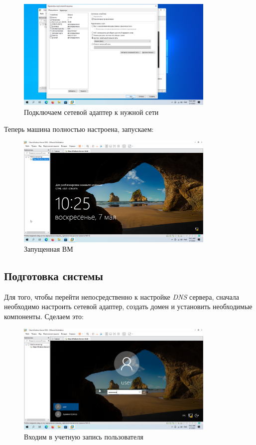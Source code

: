 \documentclass[a4paper]{article}
\begin{document}
  \begin{figure}[H]
    \centering
    \includegraphics[width=0.85\textwidth]{9_0011}
    \caption{Подключаем сетевой адаптер к нужной сети}
    \label{img:0011}
  \end{figure}

  Теперь машина полностью настроена, запускаем:

  \begin{figure}[H]
    \centering
    \includegraphics[width=0.85\textwidth]{9_0012}
    \caption{Запущенная ВМ}
    \label{img:0012}
  \end{figure}

  \subsection{Подготовка системы}

  Для того, чтобы перейти непосредственно к настройке \textit{DNS} сервера, сначала
  необходимо настроить сетевой адаптер, создать домен и установить необходимые компоненты. Сделаем это:

  \begin{figure}[H]
    \centering
    \includegraphics[width=0.85\textwidth]{9_0013}
    \caption{Входим в учетную запись пользователя}
    \label{img:0013}
  \end{figure}
\end{document}
